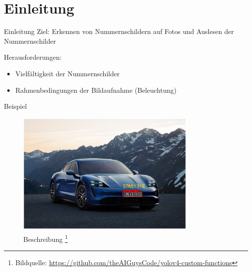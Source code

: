 \section{Einleitung}

\begin{frame}{Einleitung}
    Ziel: Erkennen von Nummernschildern auf Fotos und Auslesen der Nummernschilder
    
    Herausforderungen:
    \begin{itemize}
        \item Vielfältigkeit der Nummernschilder
        \item Rahmenbedingungen der Bildaufnahme (Beleuchtung)
    \end{itemize}
\end{frame}

\begin{frame}{Beispiel}
  \begin{figure}
    \begin{center}
      \includegraphics[width=0.8\textwidth]{bilder/Bild2}
      \caption{Beschreibung
      \footnote{Bildquelle: \url{https://github.com/theAIGuysCode/yolov4-custom-functions}}}
    \end{center}
  \end{figure}
\end{frame}
